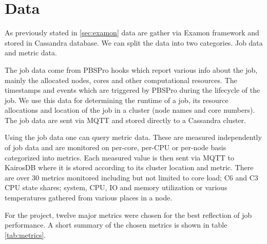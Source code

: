 \section{Data}
\label{sec:data}

As previously stated in \ref{sec:examon} data are gather via Examon framework and stored in Cassandra database. We can split the data into two categories. Job data and metric data.

The job data come from PBSPro hooks which report various info about the job, mainly the allocated nodes, cores and other computational resources. The timestamps and events which are triggered by PBSPro during the lifecycle of the job. We use this data for determining the runtime of a job, its resource allocations and location of the job in a cluster (node names and core numbers). The job data are sent via MQTT and stored directly to a Cassandra cluster.

Using the job data one can query metric data. These are measured independently of job data and are monitored on per-core, per-CPU or per-node basis categorized into metrics. Each measured value is then sent via MQTT to KairosDB where it is stored according to its cluster location and metric. There are over 30 metrics monitored including but not limited to core load; C6 and C3 CPU state shares; system, CPU, IO and memory utilization or various temperatures gathered from various places in a node.

For the project, twelve major metrics were chosen for the best reflection of job performance. A short summary of the chosen metrics is shown in table \ref{tab:metrics}.

